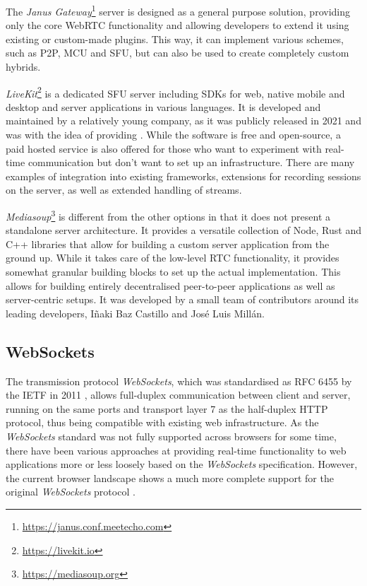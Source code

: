 The \emph{Janus Gateway}\footnote{\url{https://janus.conf.meetecho.com}} server is designed as a general purpose solution, providing only the core \ac{WebRTC} functionality and allowing developers to extend it using existing or custom-made plugins. This way, it can implement various schemes, such as \ac{P2P}, \ac{MCU} and \ac{SFU}, but can also be used to create completely custom hybrids.

\emph{LiveKit}\footnote{\url{https://livekit.io}} is a dedicated \ac{SFU} server including \ac{SDK}s for web, native mobile and desktop and server applications in various languages. It is developed and maintained by a relatively young company, as it was publicly released in 2021 and was  with the idea of providing  \parencite{livekitAbout}. While the software is free and open-source, a paid hosted service is also offered for those who want to experiment with real-time communication but don't want to set up an infrastructure. There are many examples of integration into existing frameworks, extensions for recording sessions on the server, as well as extended handling of streams.

\emph{Mediasoup}\footnote{\url{https://mediasoup.org}} is different from the other options in that it does not present a standalone server architecture. It provides a versatile collection of Node, Rust and C++ libraries that allow for building a custom server application from the ground up. While it takes care of the low-level \ac{RTC} functionality, it provides somewhat granular building blocks to set up the actual implementation. This allows for building entirely decentralised peer-to-peer applications as well as server-centric setups. It was developed by a small team of contributors around its leading developers, Iñaki Baz Castillo and José Luis Millán.

\subsection{WebSockets}

The transmission protocol \emph{WebSockets}, which was standardised as \ac{RFC} 6455 by the \ac{IETF} in 2011 \parencite{webSocketsProtocolRfc}, allows full-duplex communication between client and server, running on the same ports and transport layer 7 as the half-duplex \ac{HTTP} protocol, thus being compatible with existing web infrastructure. As the \emph{WebSockets} standard was not fully supported across browsers for some time, there have been various approaches at providing real-time functionality to web applications more or less loosely based on the \emph{WebSockets} specification. However, the current browser landscape shows a much more complete support for the original \emph{WebSockets} protocol \parencite{canIUseWebSockets}.

